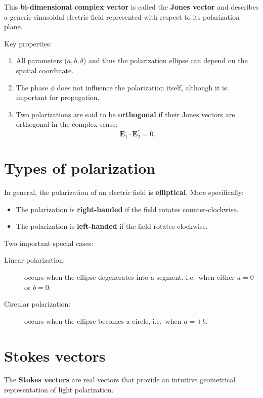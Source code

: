 This \textbf{bi-dimensional complex vector} is called the \textbf{Jones vector} and describes a generic sinusoidal electric field represented with respect to its polarization plane.

\medskip
\noindent Key properties:
\begin{enumerate}
    \item All parameters ($a,b,\delta$) and thus the polarization ellipse can depend on the spatial coordinate.
    \item The phase $\phi$ does not influence the polarization itself, although it is important for propagation.
    \item Two polarizations are said to be \textbf{orthogonal} if their Jones vectors are orthogonal in the complex sense:
    \[
        \mathbf{E}_1\cdot\mathbf{E}_2^* = 0.
    \]
\end{enumerate}

\section{Types of polarization}

In general, the polarization of an electric field is \textbf{elliptical}.  
More specifically:
\begin{itemize}
    \item The polarization is \textbf{right-handed} if the field rotates counter-clockwise.
    \item The polarization is \textbf{left-handed} if the field rotates clockwise.
\end{itemize}

Two important special cases:
\begin{description}
    \item[Linear polarization:] occurs when the ellipse degenerates into a segment, i.e.\ when either $a=0$ or $b=0$.
    \item[Circular polarization:] occurs when the ellipse becomes a circle, i.e.\ when $a=\pm b$.
\end{description}

\section{Stokes vectors}

The \textbf{Stokes vectors} are real vectors that provide an intuitive geometrical representation of light polarization.

